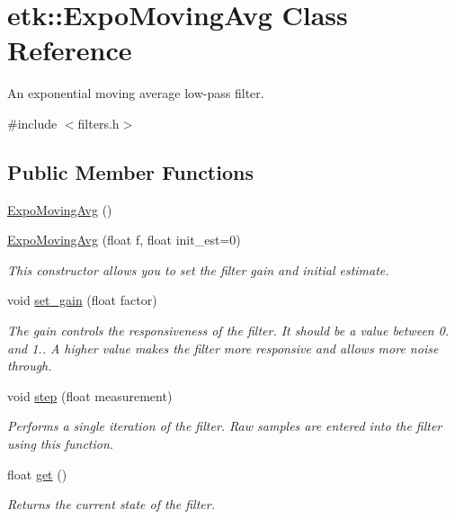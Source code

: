\hypertarget{classetk_1_1_expo_moving_avg}{\section{etk\-:\-:Expo\-Moving\-Avg Class Reference}
\label{classetk_1_1_expo_moving_avg}
}


An exponential moving average low-\/pass filter.  




{\ttfamily \#include $<$filters.\-h$>$}

\subsection*{Public Member Functions}
\begin{DoxyCompactItemize}
\item 
\hyperlink{classetk_1_1_expo_moving_avg_a764f074a90b4d376aeeb545ab3b03f3f}{Expo\-Moving\-Avg} ()
\item 
\hyperlink{classetk_1_1_expo_moving_avg_a33465de8293f5f2b6574b4f05850e28e}{Expo\-Moving\-Avg} (float f, float init\-\_\-est=0)
\begin{DoxyCompactList}\small\item\em This constructor allows you to set the filter gain and initial estimate. \end{DoxyCompactList}\item 
void \hyperlink{classetk_1_1_expo_moving_avg_a2b53f8e3138304f9a2ea40d386cc445e}{set\-\_\-gain} (float factor)
\begin{DoxyCompactList}\small\item\em The gain controls the responsiveness of the filter. It should be a value between 0. and 1.. A higher value makes the filter more responsive and allows more noise through. \end{DoxyCompactList}\item 
void \hyperlink{classetk_1_1_expo_moving_avg_a34781b6d18a0e66d47a3006d567452f9}{step} (float measurement)
\begin{DoxyCompactList}\small\item\em Performs a single iteration of the filter. Raw samples are entered into the filter using this function. \end{DoxyCompactList}\item 
float \hyperlink{classetk_1_1_expo_moving_avg_ab9b907437d2d2862c64459c34fc35939}{get} ()
\begin{DoxyCompactList}\small\item\em Returns the current state of the filter. \end{DoxyCompactList}\end{DoxyCompactItemize}


